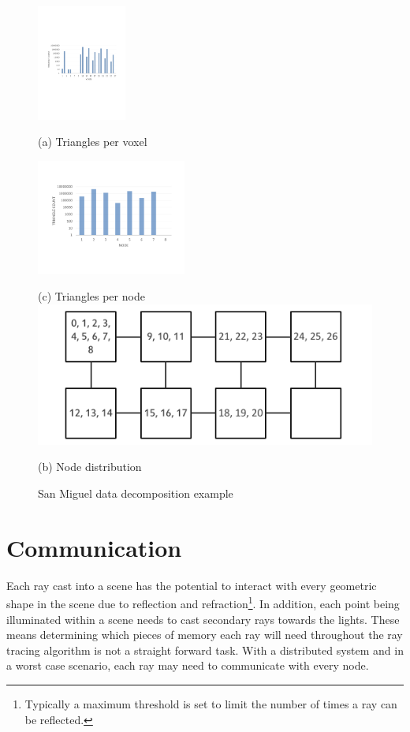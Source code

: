 \begin{figure}[!htb]
  \includegraphics[height=3.8cm]{drawings/VoxelDistribution.pdf}
  
  (a) Triangles per voxel
  
  \includegraphics[height=3.8cm]{drawings/DataDistribution.pdf}
  
  (c) Triangles per node  
\endminipage\hfill
{}
  \includegraphics[width=\linewidth]{drawings/NodeDistribution.pdf}  
  
  (b) Node distribution  
\endminipage
\caption{San Miguel data decomposition example}
\label{fig:san_miguel_data}
\end{figure}


\section{Communication} 
\label{sec:communication}
Each ray cast into a scene has the potential to interact with every geometric
shape in the scene due to reflection and refraction\footnote{ %
  Typically a maximum threshold is set to limit the number of times a ray
  can be reflected. 
}.  In addition, each point being illuminated within a scene needs to cast 
secondary rays towards the lights.  These means determining which pieces of 
memory each ray will need throughout the ray tracing algorithm is not a straight
forward task.  With a distributed system and in a worst case scenario, each ray 
may need to communicate with every node.  

